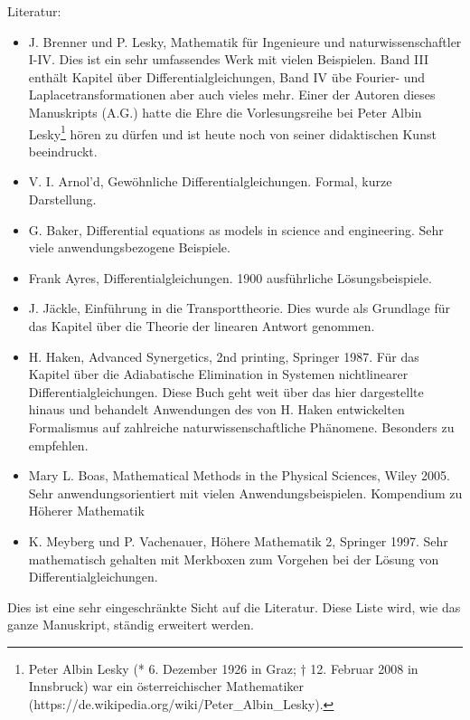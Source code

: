 \documentclass[a4paper,12pt]{book}%
\begin{document}
Literatur:
\begin{itemize}
  \item J. Brenner und P. Lesky, Mathematik für Ingenieure und
    naturwissenschaftler I-IV. Dies ist ein sehr umfassendes Werk mit vielen
    Beispielen. Band III enthält Kapitel über Differentialgleichungen, Band IV
    übe Fourier- und Laplacetransformationen aber auch vieles mehr. Einer der
    Autoren dieses Manuskripts (A.G.) hatte die Ehre die Vorlesungsreihe bei
    Peter Albin Lesky\footnote{Peter Albin Lesky (* 6. Dezember 1926 in Graz; †
    12. Februar 2008 in Innsbruck) war ein österreichischer Mathematiker
    (https://de.wikipedia.org/wiki/Peter\_Albin\_Lesky). } hören zu dürfen und ist
    heute noch von seiner didaktischen Kunst beeindruckt.
  \item V. I. Arnol'd, Gewöhnliche Differentialgleichungen. Formal, kurze
    Darstellung.
  \item G. Baker, Differential equations as models in science and engineering.
    Sehr viele anwendungsbezogene Beispiele.
  \item Frank Ayres, Differentialgleichungen. 1900 ausführliche Lösungsbeispiele.
  \item J. Jäckle, Einführung in die Transporttheorie. Dies wurde als Grundlage
    für das Kapitel über die Theorie der linearen Antwort genommen.
  \item H. Haken, Advanced Synergetics, 2nd printing, Springer 1987. Für das
    Kapitel über die Adiabatische Elimination in Systemen nichtlinearer
    Differentialgleichungen. Diese Buch geht weit über das hier dargestellte
    hinaus und behandelt Anwendungen des von H. Haken entwickelten Formalismus
    auf zahlreiche naturwissenschaftliche Phänomene. Besonders zu empfehlen.
  \item Mary L. Boas,  Mathematical Methods in the Physical Sciences, Wiley
    2005. Sehr anwendungsorientiert mit vielen Anwendungsbeispielen.
    Kompendium zu Höherer Mathematik 
  \item K. Meyberg und P. Vachenauer, Höhere Mathematik 2, Springer 1997.  Sehr
    mathematisch gehalten mit Merkboxen zum Vorgehen bei der Lösung von
    Differentialgleichungen. 
\end{itemize}
Dies ist eine sehr eingeschränkte Sicht auf die Literatur. Diese Liste wird,
wie das ganze Manuskript, ständig erweitert werden.
\newpage
\tableofcontents
\newpage 
\mainmatter







%
%
\begin{appendices}
\noappendicestocpagenum
\renewcommand\appendixtocname{Anhang}
\renewcommand\appendixpagename{Anhang}


%
\end{appendices}
\end{document}
